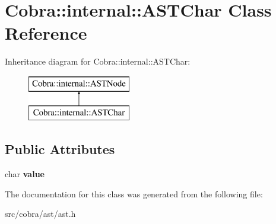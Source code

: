 \hypertarget{class_cobra_1_1internal_1_1_a_s_t_char}{\section{Cobra\+:\+:internal\+:\+:A\+S\+T\+Char Class Reference}
\label{class_cobra_1_1internal_1_1_a_s_t_char}
}
Inheritance diagram for Cobra\+:\+:internal\+:\+:A\+S\+T\+Char\+:\begin{figure}[H]
\begin{center}
\leavevmode
\includegraphics[height=2.000000cm]{class_cobra_1_1internal_1_1_a_s_t_char}
\end{center}
\end{figure}
\subsection*{Public Attributes}
\begin{DoxyCompactItemize}
\item 
\hypertarget{class_cobra_1_1internal_1_1_a_s_t_char_aa8b815df4fb708f5af29f9bb5311967d}{char {\bfseries value}}\label{class_cobra_1_1internal_1_1_a_s_t_char_aa8b815df4fb708f5af29f9bb5311967d}

\end{DoxyCompactItemize}


The documentation for this class was generated from the following file\+:\begin{DoxyCompactItemize}
\item 
src/cobra/ast/ast.\+h\end{DoxyCompactItemize}

